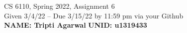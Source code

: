 \documentclass[11pt]{article}
\begin{document}

\newlength{\minpagw}
\settowidth{\minpagw}{\hspace{40em}}

\begin{center}
\begin{large}
  CS 6110, Spring 2022, Assignment 6  \\
  Given 3/4/22 -- Due 3/15/22 by 11:59 pm via your Github 
  \ \\
    {  {\Large\bf NAME: Tripti Agarwal} \hfill {\Large\bf UNID: u1319433}\hspace{4cm} }
          \ \\
\end{large}

\end{center}
\end{document}
